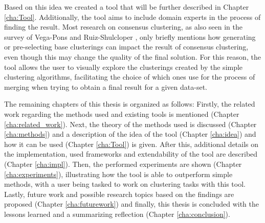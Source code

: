 Based on this idea we created a tool that will be further described in Chapter \ref{cha:Tool}. Additionally, the tool aims to include domain experts in the process of finding the result. Most research on consensus clustering, as also seen in the survey of Vega-Pons and Ruiz-Shulcloper \cite{survey1}, only briefly mentions how generating or pre-selecting base clusterings can impact the result of consensus clustering, even though this may change the quality of the final solution. For this reason, the tool allows the user to visually explore the clusterings created by the simple clustering algorithms, facilitating the choice of which ones use for the process of merging when trying to obtain a final result for a given data-set.

The remaining chapters of this thesis is organized as follows: Firstly, the related work regarding the methods used and existing tools is mentioned (Chapter \ref{cha:related_work}). Next, the theory of the methods used is discussed (Chapter \ref{cha:methods}) and a description of the idea of the tool (Chapter \ref{cha:idea}) and how it can be used (Chapter \ref{cha:Tool}) is given. After this, additional details on the implementation, used frameworks and extendability of the tool are described (Chapter \ref{cha:impl}). Then, the performed experiments are shown (Chapter \ref{cha:experiments}), illustrating how the tool is able to outperform simple methods, with a user being tasked to work on clustering tasks with this tool. Lastly, future work and possible research topics based on the findings are proposed (Chapter \ref{cha:futurework}) and finally, this thesis is concluded with the lessons learned and a summarizing reflection (Chapter \ref{cha:conclusion}).
